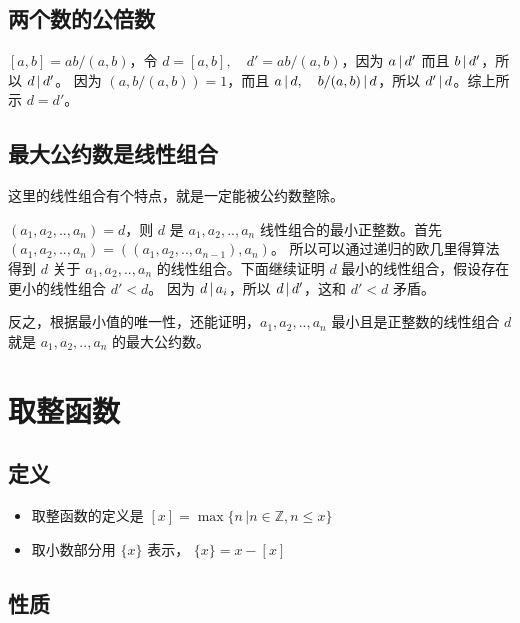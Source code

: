 \subsection{两个数的公倍数}


$\left[ a, b\right] = ab /(a,b)$，令 $d = \left[ a, b\right], \quad d' = ab/(a,b)$，因为 $a \,\vert\, d'$ 而且 $b \,\vert\, d'$，所以 $ d \,\vert\, d'$。
因为 $(a, b/(a,b)) = 1$，而且 $a \,\vert\, d, \quad b/(a,b) \,\vert\, d$，所以 $d' \,\vert\, d$。综上所示 $d = d'$。


\subsection{最大公约数是线性组合}

这里的线性组合有个特点，就是一定能被公约数整除。

$(a_1,a_2,..,a_n) = d$，则 $d$ 是 $a_1, a_2, .., a_n$ 线性组合的最小正整数。首先 $(a_1, a_2, .., a_n) = ((a_1, a_2, .., a_{n-1}), a_n)$。
所以可以通过递归的欧几里得算法得到 $d$ 关于 $a_1, a_2, .., a_n$ 的线性组合。下面继续证明 $d$ 最小的线性组合，假设存在更小的线性组合 $d' < d$。
因为 $d \,\vert\, a_i$，所以 $d \,\vert\, d'$，这和 $d' < d$ 矛盾。

反之，根据最小值的唯一性，还能证明，$a_1, a_2, .., a_n$ 最小且是正整数的线性组合 $d$ 就是 $a_1, a_2, .., a_n$ 的最大公约数。


\section{取整函数}

\subsection{定义}

\begin{itemize}
\item 取整函数的定义是 $[x] = \max \{ n \, \vert n \in \mathbb{Z}, n \le x \} $
\item 取小数部分用 $\{x\}$ 表示， $ \{x\} = x - [x] $
\end{itemize}

\subsection{性质}

